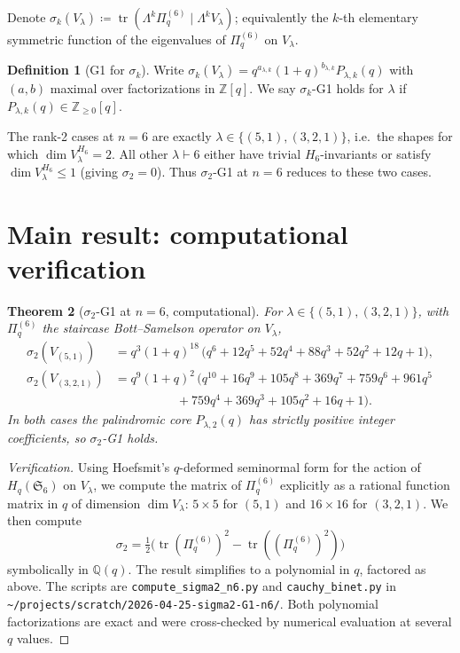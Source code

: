 \documentclass[11pt]{article}
\theoremstyle{plain}
\newtheorem{theorem}{Theorem}
\theoremstyle{definition}
\newtheorem{definition}[theorem]{Definition}
\theoremstyle{remark}
\newcommand{\Z}{\mathbb{Z}}
\newcommand{\Q}{\mathbb{Q}}
\newcommand{\Sym}{\mathfrak{S}}
\newcommand{\Hq}{H_q}
\newcommand{\Pibs}{\Pi_q}
\newcommand{\Vlam}{V_\lambda}
\newcommand{\trace}{\operatorname{tr}}
\begin{document}
Denote $\sigma_k(\Vlam) \coloneqq \trace(\Lambda^k \Pibs^{(6)} \mid \Lambda^k \Vlam)$;
equivalently the $k$-th elementary symmetric function of the eigenvalues of
$\Pibs^{(6)}$ on $V_\lambda$.

\begin{definition}[G1 for $\sigma_k$]
Write $\sigma_k(\Vlam) = q^{a_{\lambda,k}}(1+q)^{b_{\lambda,k}} P_{\lambda,k}(q)$
with $(a,b)$ maximal over factorizations in $\Z[q]$. We say $\sigma_k$-G1
holds for $\lambda$ if $P_{\lambda,k}(q) \in \Z_{\geq 0}[q]$.
\end{definition}

The rank-2 cases at $n = 6$ are exactly $\lambda \in \{(5,1),(3,2,1)\}$,
i.e.\ the shapes for which $\dim V_\lambda^{H_6} = 2$. All other $\lambda \vdash 6$
either have trivial $H_6$-invariants or satisfy $\dim V_\lambda^{H_6} \leq 1$
(giving $\sigma_2 = 0$). Thus $\sigma_2$-G1 at $n = 6$ reduces to these two cases.

\section{Main result: computational verification}

\begin{theorem}[$\sigma_2$-G1 at $n=6$, computational]\label{thm:main}
For $\lambda \in \{(5,1),(3,2,1)\}$, with $\Pibs^{(6)}$ the staircase
Bott--Samelson operator on $V_\lambda$,
\begin{align}
\sigma_2(V_{(5,1)}) &= q^3 (1+q)^{18}\,\bigl(q^6 + 12q^5 + 52q^4 + 88q^3 + 52q^2 + 12q + 1\bigr), \label{eq:sig2-51}\\
\sigma_2(V_{(3,2,1)}) &= q^9 (1+q)^2\,\bigl(q^{10} + 16q^9 + 105q^8 + 369q^7 + 759q^6 + 961q^5 \nonumber\\
&\qquad\qquad\quad + 759q^4 + 369q^3 + 105q^2 + 16q + 1\bigr). \label{eq:sig2-321}
\end{align}
In both cases the palindromic core $P_{\lambda,2}(q)$ has strictly positive
integer coefficients, so $\sigma_2$-G1 holds.
\end{theorem}

\begin{proof}[Verification]
Using Hoefsmit's $q$-deformed seminormal form
\cite{hoefsmit} for the action of $\Hq(\Sym_6)$ on $V_\lambda$, we compute the
matrix of $\Pibs^{(6)}$ explicitly as a rational function matrix in $q$
of dimension $\dim V_\lambda$: $5 \times 5$ for $(5,1)$ and $16 \times 16$
for $(3,2,1)$. We then compute
\[ \sigma_2 = \tfrac{1}{2}\bigl(\trace(\Pibs^{(6)})^2 - \trace((\Pibs^{(6)})^2)\bigr) \]
symbolically in $\Q(q)$. The result simplifies to a polynomial in $q$,
factored as above. The scripts are
\verb|compute_sigma2_n6.py| and \verb|cauchy_binet.py|
in \verb|~/projects/scratch/2026-04-25-sigma2-G1-n6/|. Both polynomial
factorizations are exact and were cross-checked by numerical evaluation at
several $q$ values.\qedhere
\end{proof}
\end{document}
